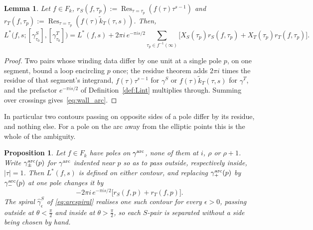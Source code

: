 \documentclass[11pt]{article}
\newtheorem{lemma}[theorem]{Lemma}
\newtheorem{proposition}[theorem]{Proposition}
\newcommand{\tk}{\widetilde{k}_T}
\DeclareMathOperator{\Res}{Res}
\begin{document}
\begin{lemma}\label{lem:wall_arc}
Let $f\in F_k$, $r_S(f, \tau_p) := \Res_{\tau=\tau_p} (f(\tau) \tau^{s-1})$
and $r_T(f, \tau_p) := \Res_{\tau=\tau_p} (f(\tau) \tk(\tau, s))$. Then,
\begin{equation}\label{eq:wall_arc}
L^*\big(f,s;[\gamma^S_{\tau_0}],[\gamma^T_{\tau_0}]\big)
= L^*(f,s)
+ 2\pi i\,e^{-\pi i s/2}\sum_{\tau_p\in f^{-1}(\infty)}\Big[
X_S(\tau_p) r_S(f, \tau_p)
+ X_T(\tau_p) r_T(f, \tau_p) \Big].
\end{equation}
\end{lemma}

\begin{proof}
Two pairs whose winding data differ by one unit at a single pole $p$, on one segment, bound a loop
encircling $p$ once; the residue theorem adds $2\pi i$ times the residue of that segment's
integrand, $f(\tau)\tau^{s-1}$ for $\gamma^S$ or $f(\tau)\tk(\tau,s)$ for $\gamma^T$, and the
prefactor $e^{-\pi i s/2}$ of Definition~\ref{def:Lint} multiplies through. Summing over crossings
gives~\eqref{eq:wall_arc}.
\end{proof}

In particular two contours passing on opposite sides of a pole differ by its residue, and nothing
else. For a pole on the arc away from the elliptic points this is the whole of the ambiguity.

\begin{proposition}\label{prop:arcside}
Let $f\in F_k$ have poles on $\gamma^{\rm arc}$, none of them at $i$, $\rho$ or $\rho+1$. Write
$\gamma^{\rm arc}_{\pm}(p)$ for $\gamma^{\rm arc}$ indented near $p$ so as to pass outside,
respectively inside, $|\tau|=1$. Then $L^*(f,s)$ is defined on either contour, and replacing
$\gamma^{\rm arc}_{+}(p)$ by $\gamma^{\rm arc}_{-}(p)$ at one pole changes it by
\begin{equation}\label{eq:sidediff}
-2\pi i\,e^{-\pi is/2}\big[r_S(f,p)+r_T(f,p)\big].
\end{equation}
The spiral $\hat\gamma^S_\epsilon$ of \eqref{eq:arcspiral} realises one such contour for every
$\epsilon>0$, passing outside at $\theta<\tfrac{\pi}{2}$ and inside at $\theta>\tfrac{\pi}{2}$, so
each $S$-pair is separated without a side being chosen by hand.
\end{proposition}
\end{document}
